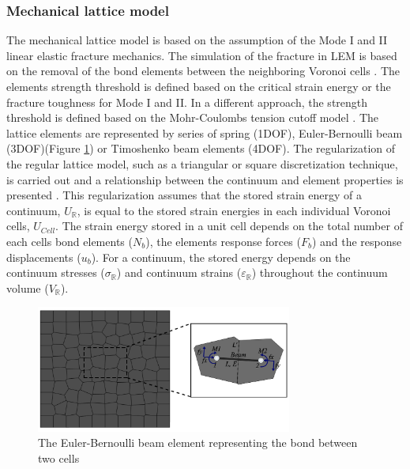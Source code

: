 \subsubsection*{Mechanical lattice model}
\label{Section:MechanicalLattice}

The mechanical lattice model is based on the assumption of the Mode I and II linear elastic fracture mechanics. The simulation of the fracture in LEM is based on the removal of the bond elements between the neighboring Voronoi cells \cite{Rizvietal2019a}. The elements strength threshold is defined based on the critical strain energy or the fracture toughness for Mode I and II. In a different approach, the strength threshold is defined based on the Mohr-Coulombs tension cutoff model \cite{Bolanderetal1998}. The lattice elements are represented by series of spring (1DOF),  Euler-Bernoulli beam (3DOF)(Figure \ref{fig:Amir_LEM_Beam}) or Timoshenko beam elements (4DOF). The regularization of the regular lattice model, such as a triangular or square discretization technique, is carried out and a relationship between the continuum and element properties is presented \cite{Ostojastarzewski2002, Karihalooetal2003}. This regularization assumes that the stored strain energy of a continuum, $U_{\mathbb{R}}$, is equal to the stored strain energies in each individual Voronoi cells, $U_{Cell}$. The strain energy stored in a unit cell depends on the total number of each cells bond elements ($N_b$), the elements response forces ($F_b$) and the response displacements ($u_b$). For a continuum, the stored energy depends on the continuum stresses ($\sigma_{\mathbb{R}}$) and continuum strains ($\varepsilon_{\mathbb{R}}$) throughout the continuum volume ($V_{\mathbb{R}}$).

\begin{figure}[!ht]
\centering
\includegraphics[width=0.75\textwidth]{figures/Amir_LEM_Beam.png}
\caption{The Euler-Bernoulli beam element representing the bond between two cells}
\label{fig:Amir_LEM_Beam}
\end{figure}

